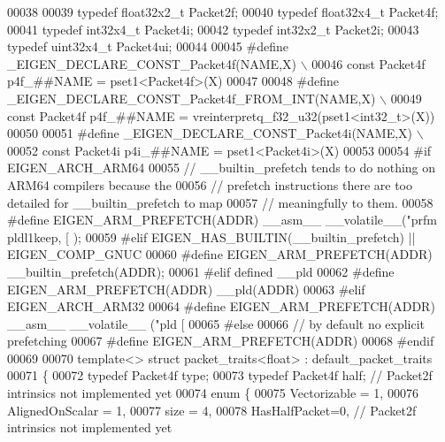 \begin{DoxyCode}
00038 
00039 \textcolor{keyword}{typedef} float32x2\_t Packet2f;
00040 \textcolor{keyword}{typedef} float32x4\_t Packet4f;
00041 \textcolor{keyword}{typedef} int32x4\_t   Packet4i;
00042 \textcolor{keyword}{typedef} int32x2\_t   Packet2i;
00043 \textcolor{keyword}{typedef} uint32x4\_t  Packet4ui;
00044 
00045 \textcolor{preprocessor}{#define \_EIGEN\_DECLARE\_CONST\_Packet4f(NAME,X) \(\backslash\)}
00046 \textcolor{preprocessor}{  const Packet4f p4f\_##NAME = pset1<Packet4f>(X)}
00047 
00048 \textcolor{preprocessor}{#define \_EIGEN\_DECLARE\_CONST\_Packet4f\_FROM\_INT(NAME,X) \(\backslash\)}
00049 \textcolor{preprocessor}{  const Packet4f p4f\_##NAME = vreinterpretq\_f32\_u32(pset1<int32\_t>(X))}
00050 
00051 \textcolor{preprocessor}{#define \_EIGEN\_DECLARE\_CONST\_Packet4i(NAME,X) \(\backslash\)}
00052 \textcolor{preprocessor}{  const Packet4i p4i\_##NAME = pset1<Packet4i>(X)}
00053 
00054 \textcolor{preprocessor}{#if EIGEN\_ARCH\_ARM64}
00055   \textcolor{comment}{// \_\_builtin\_prefetch tends to do nothing on ARM64 compilers because the}
00056   \textcolor{comment}{// prefetch instructions there are too detailed for \_\_builtin\_prefetch to map}
00057   \textcolor{comment}{// meaningfully to them.}
00058 \textcolor{preprocessor}{  #define EIGEN\_ARM\_PREFETCH(ADDR)  \_\_asm\_\_ \_\_volatile\_\_("prfm pldl1keep, [%
       );}
00059 \textcolor{preprocessor}{#elif EIGEN\_HAS\_BUILTIN(\_\_builtin\_prefetch) || EIGEN\_COMP\_GNUC}
00060 \textcolor{preprocessor}{  #define EIGEN\_ARM\_PREFETCH(ADDR) \_\_builtin\_prefetch(ADDR);}
00061 \textcolor{preprocessor}{#elif defined \_\_pld}
00062 \textcolor{preprocessor}{  #define EIGEN\_ARM\_PREFETCH(ADDR) \_\_pld(ADDR)}
00063 \textcolor{preprocessor}{#elif EIGEN\_ARCH\_ARM32}
00064 \textcolor{preprocessor}{  #define EIGEN\_ARM\_PREFETCH(ADDR) \_\_asm\_\_ \_\_volatile\_\_ ("pld [%
00065 \textcolor{preprocessor}{#else}
00066   \textcolor{comment}{// by default no explicit prefetching}
00067 \textcolor{preprocessor}{  #define EIGEN\_ARM\_PREFETCH(ADDR)}
00068 \textcolor{preprocessor}{#endif}
00069 
00070 \textcolor{keyword}{template}<> \textcolor{keyword}{struct }packet\_traits<float>  : default\_packet\_traits
00071 \{
00072   \textcolor{keyword}{typedef} Packet4f type;
00073   \textcolor{keyword}{typedef} Packet4f half; \textcolor{comment}{// Packet2f intrinsics not implemented yet}
00074   \textcolor{keyword}{enum} \{
00075     Vectorizable = 1,
00076     AlignedOnScalar = 1,
00077     size = 4,
00078     HasHalfPacket=0, \textcolor{comment}{// Packet2f intrinsics not implemented yet}
}
\end{DoxyCode}
